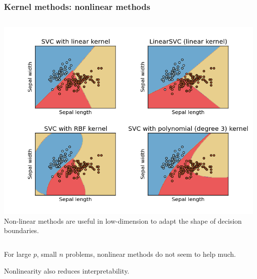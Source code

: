 \begin{frame}
\frametitle{Kernel methods: nonlinear methods}
\begin{columns}[cc]
\includegraphics[width=\textwidth]{sklearn_material/plot_iris_0012.png}
 Non-linear methods are useful in low-dimension
to adapt the shape of decision boundaries.
\end{columns}
For large $p$, small $n$ problems, nonlinear methods do not seem to help much.\par
Nonlinearity also reduces interpretability.
\end{frame}

